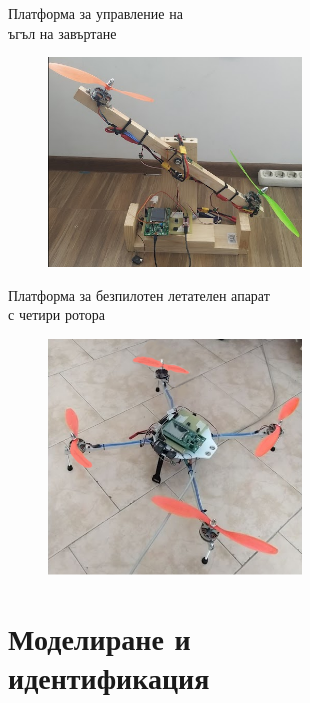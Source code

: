 \documentclass[handout]{beamer}
\begin{document}
\begin{frame}{Платформа за управление на \\ъгъл на завъртане}
	\begin{figure}[htpb!]
		\centering
		\includegraphics[width=0.6\textwidth]{Images/balance_construction.png}
	\end{figure}

\end{frame}

\begin{frame}{Платформа за безпилотен летателен апарат \\с четири ротора }
	\begin{figure}[htpb!]
		\centering
		\includegraphics[width=0.6\textwidth]{Images/drone_construction.png}
	\end{figure}
\end{frame}




\section{Моделиране и \\идентификация}
\end{document}
